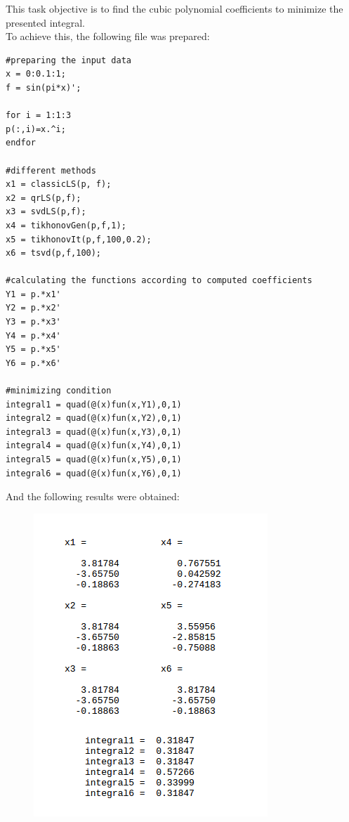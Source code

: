 \documentclass[eng,openany]{mgr}
\begin{document}
This task objective is to find the cubic polynomial coefficients to minimize the presented integral.\\
To achieve this, the following file was prepared:
\begin{lstlisting}
#preparing the input data
x = 0:0.1:1;
f = sin(pi*x)';

for i = 1:1:3
p(:,i)=x.^i;
endfor

#different methods
x1 = classicLS(p, f);
x2 = qrLS(p,f);
x3 = svdLS(p,f);
x4 = tikhonovGen(p,f,1);
x5 = tikhonovIt(p,f,100,0.2);
x6 = tsvd(p,f,100);

#calculating the functions according to computed coefficients
Y1 = p.*x1'
Y2 = p.*x2'
Y3 = p.*x3'
Y4 = p.*x4'
Y5 = p.*x5'
Y6 = p.*x6'

#minimizing condition
integral1 = quad(@(x)fun(x,Y1),0,1)
integral2 = quad(@(x)fun(x,Y2),0,1)
integral3 = quad(@(x)fun(x,Y3),0,1)
integral4 = quad(@(x)fun(x,Y4),0,1)
integral5 = quad(@(x)fun(x,Y5),0,1)
integral6 = quad(@(x)fun(x,Y6),0,1)
\end{lstlisting}
\newpage
And the following results were obtained:
\begin{figure}[h]
\centering
\includegraphics[width=0.5\linewidth]{screenshot024}
\label{fig:screenshot024}
\end{figure}
\end{document}
